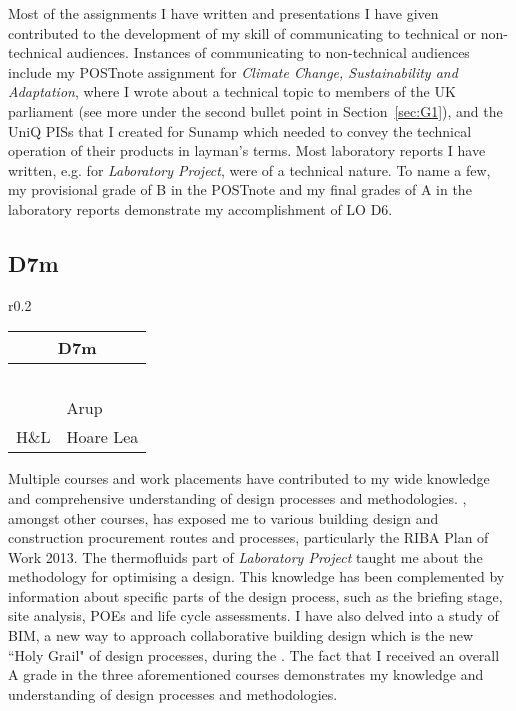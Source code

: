 Most of the assignments I have written and presentations I have given contributed to the development of my skill of communicating to technical or non-technical audiences.
Instances of communicating to non-technical audiences include my POSTnote assignment for \textit{Climate Change, Sustainability and Adaptation}, where I wrote about a technical topic to members of the UK parliament (see more under the second bullet point in Section~\ref{sec:G1}), and the UniQ PISs that I created for Sunamp which needed to convey the technical operation of their products in layman's terms.
Most laboratory reports I have written, e.g. for \textit{Laboratory Project}, were of a technical nature.
To name a few, my provisional grade of B in the POSTnote and my final grades of A in the laboratory reports demonstrate my accomplishment of LO D6.







\subsection*{D7m}

\begin{wraptable}{r}{0.2\textwidth}
	\begin{tabular}{|ll|}
		\hline
		\multicolumn{2}{|c|}{\cellcolor[HTML]{F8A102}\textbf{D7m \nomaster}} \\ \hline
		\ConTechOne & \ID \\
		\EnvBeh & \CAS \\
		\PC & \FMP \\
		\PRJ & \DST \\
		\LAB & \SIB \\
		\ICP & Arup \\
		H{\&}L & Hoare Lea \\ \hline
	\end{tabular}
\end{wraptable}

Multiple courses and work placements have contributed to my wide knowledge and comprehensive understanding of design processes and methodologies.
\PC, amongst other courses, has exposed me to various building design and construction procurement routes and processes, particularly the RIBA Plan of Work 2013.
The thermofluids part of \textit{Laboratory Project} taught me about the methodology for optimising a design.
This knowledge has been complemented by information about specific parts of the design process, such as the briefing stage, site analysis, POEs and life cycle assessments.
I have also delved into a study of BIM, a new way to approach collaborative building design which is the new ``Holy Grail" of design processes, during the \DSTTitle.
The fact that I received an overall A grade in the three aforementioned courses demonstrates my knowledge and understanding of design processes and methodologies.

